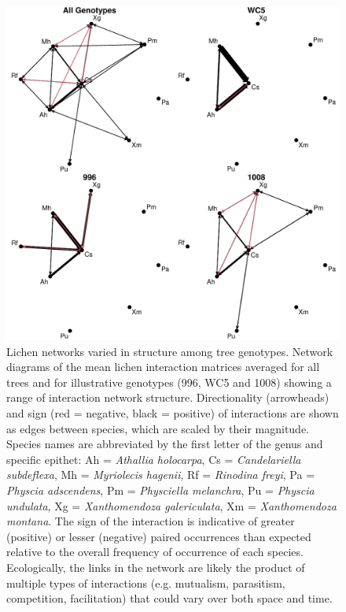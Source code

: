 \documentclass[fleqn,12pt]{olplainarticle}
\begin{document}
\begin{figure}[ht]
\centering
\includegraphics[width=\linewidth]{figures/cn_onc.pdf}
\caption{Lichen networks varied in structure among tree
  genotypes. Network diagrams of the mean lichen interaction matrices
  averaged for all trees and for illustrative genotypes (996, WC5 and
  1008) showing a range of interaction network
  structure. Directionality (arrowheads) and sign (red = negative,
  black = positive) of interactions are shown as edges between
  species, which are scaled by their magnitude.  Species names are
  abbreviated by the first letter of the genus and specific epithet:
  Ah = \textit{Athallia holocarpa}, Cs = \textit{Candelariella
    subdeflexa}, Mh = \textit{Myriolecis hagenii}, Rf =
  \textit{Rinodina freyi}, Pa = \textit{Physcia adscendens}, Pm =
  \textit{Physciella melanchra}, Pu = \textit{Physcia undulata}, Xg =
  \textit{Xanthomendoza galericulata}, Xm = \textit{Xanthomendoza
    montana}. The sign of the interaction is indicative of greater
  (positive) or lesser (negative) paired occurrences than expected
  relative to the overall frequency of occurrence of each
  species. Ecologically, the links in the network are likely the
  product of multiple types of interactions (e.g. mutualism,
  parasitism, competition, facilitation) that could vary over both
  space and time.}
\label{fig:geno_nets}
\end{figure}
\end{document}
